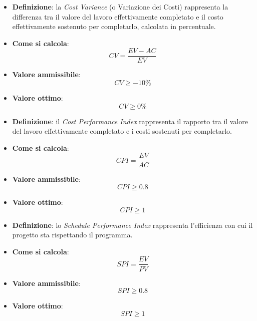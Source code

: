 \hypertarget{5M}{}
\begin{itemize}
	\item \textbf{Definizione}: la \textit{Cost Variance} (o Variazione dei Costi) rappresenta la differenza tra il valore del lavoro effettivamente completato e il costo effettivamente sostenuto per completarlo, calcolata in percentuale.
	\item \textbf{Come si calcola}: \begin{equation*}CV = \frac{EV - AC}{EV}\end{equation*}
	\item \textbf{Valore ammissibile}: \begin{equation*}CV \geq -10\%\end{equation*}
	\item \textbf{Valore ottimo}: \begin{equation*}CV \geq 0\%\end{equation*}
\end{itemize}

\hypertarget{6M}{}
\begin{itemize}
	\item \textbf{Definizione}: il \textit{Cost Performance Index} rappresenta il rapporto tra il valore del lavoro effettivamente completato e i costi sostenuti per completarlo.
	\item \textbf{Come si calcola}: \begin{equation*}CPI = \frac{EV}{AC}\end{equation*}
	\item \textbf{Valore ammissibile}: \begin{equation*}CPI \geq 0.8\end{equation*}
	\item \textbf{Valore ottimo}: \begin{equation*}CPI \geq 1\end{equation*}
\end{itemize}

\hypertarget{7M}{}
\begin{itemize}
	\item \textbf{Definizione}: lo \textit{Schedule Performance Index} rappresenta l'efficienza con cui il progetto sta rispettando il programma.
	\item \textbf{Come si calcola}: \begin{equation*}SPI = \frac{EV}{PV}\end{equation*}
	\item \textbf{Valore ammissibile}: \begin{equation*}SPI \geq 0.8\end{equation*}
	\item \textbf{Valore ottimo}: \begin{equation*}SPI \geq 1\end{equation*}
\end{itemize}

